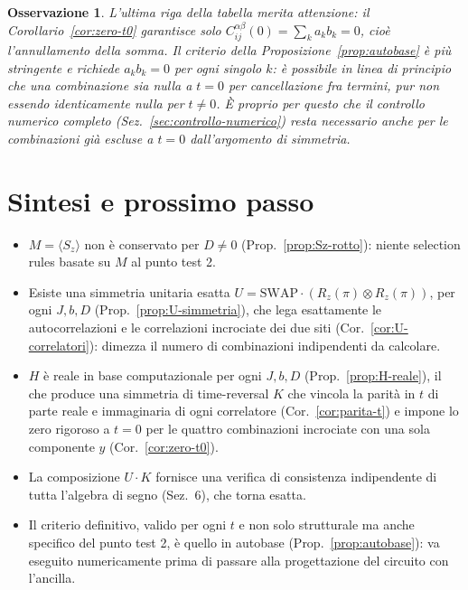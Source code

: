 \documentclass[11pt,a4paper]{article}
\newtheorem{osservazione}{Osservazione}
\begin{document}
\begin{osservazione}
L'ultima riga della tabella merita attenzione: il Corollario~\ref{cor:zero-t0} garantisce solo
$C_{ij}^{\alpha\beta}(0)=\sum_k a_kb_k=0$, cioè l'annullamento della \emph{somma}. Il criterio
della Proposizione~\ref{prop:autobase} è più stringente e richiede $a_kb_k=0$ per ogni singolo
$k$: è possibile in linea di principio che una combinazione sia nulla a $t=0$ per cancellazione
fra termini, pur non essendo identicamente nulla per $t\neq0$. È proprio per questo che il
controllo numerico completo (Sez.~\ref{sec:controllo-numerico}) resta necessario anche per le
combinazioni già escluse a $t=0$ dall'argomento di simmetria.
\end{osservazione}

\section{Sintesi e prossimo passo}

\begin{itemize}
\item $M=\langle S_z\rangle$ non è conservato per $D\neq0$ (Prop.~\ref{prop:Sz-rotto}): niente
selection rules basate su $M$ al punto test 2.
\item Esiste una simmetria unitaria esatta $U=\mathrm{SWAP}\cdot(R_z(\pi)\otimes R_z(\pi))$, per
ogni $J,b,D$ (Prop.~\ref{prop:U-simmetria}), che lega esattamente le autocorrelazioni e le
correlazioni incrociate dei due siti (Cor.~\ref{cor:U-correlatori}): dimezza il numero di
combinazioni indipendenti da calcolare.
\item $H$ è reale in base computazionale per ogni $J,b,D$ (Prop.~\ref{prop:H-reale}), il che
produce una simmetria di time-reversal $K$ che vincola la parità in $t$ di parte reale e
immaginaria di ogni correlatore (Cor.~\ref{cor:parita-t}) e impone lo zero rigoroso a $t=0$ per
le quattro combinazioni incrociate con una sola componente $y$ (Cor.~\ref{cor:zero-t0}).
\item La composizione $U\!\cdot\!K$ fornisce una verifica di consistenza indipendente di tutta
l'algebra di segno (Sez.~6), che torna esatta.
\item Il criterio definitivo, valido per ogni $t$ e non solo strutturale ma anche specifico del
punto test 2, è quello in autobase (Prop.~\ref{prop:autobase}): va eseguito numericamente prima
di passare alla progettazione del circuito con l'ancilla.
\end{itemize}
\end{document}
